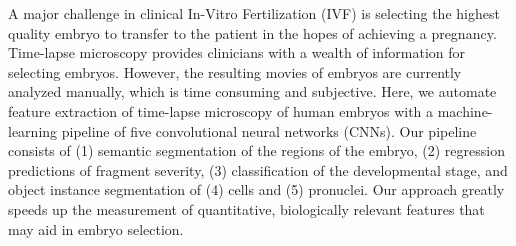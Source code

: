 
A major challenge in clinical In-Vitro Fertilization (IVF) is selecting the highest quality embryo to transfer to the patient in the hopes of achieving a pregnancy. Time-lapse microscopy provides clinicians with a wealth of information for selecting embryos. However, the resulting movies of embryos are currently analyzed manually, which is time consuming and subjective. Here, we automate feature extraction of time-lapse microscopy of human embryos with a machine-learning pipeline of five convolutional neural networks (CNNs). Our pipeline consists of (1) semantic segmentation of the regions of the embryo, (2) regression predictions of fragment severity, (3) classification of the developmental stage, and  object instance segmentation of (4) cells and (5) pronuclei. Our approach greatly speeds up the measurement of quantitative, biologically relevant features that may aid in embryo selection.

